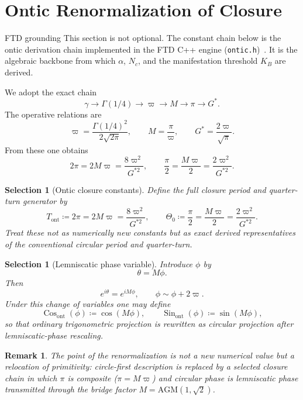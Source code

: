 \documentclass[11pt]{article}
\theoremstyle{tight}
\theoremstyle{plainroman}
\newtheorem{selection}[theorem]{Selection}
\newtheorem{remark}[theorem]{Remark}
\newcommand{\Tont}{T_{\mathrm{ont}}}
\newcommand{\Thetaont}{\Theta_{0}}
\newcommand{\Cosont}{\operatorname{Cos}_{\mathrm{ont}}}
\newcommand{\Sinont}{\operatorname{Sin}_{\mathrm{ont}}}
\begin{document}
\section{Ontic Renormalization of Closure}

\begin{cautionbox}{FTD grounding}
This section is not optional. The constant chain below is the ontic derivation chain implemented in the FTD C++ engine (\texttt{ontic.h})~\cite{ftdengine}.
It is the algebraic backbone from which $\alpha$, $N_c$, and the manifestation threshold $K_B$ are derived.
\end{cautionbox}

We adopt the exact chain
\[
\gamma \longrightarrow \Gamma(1/4) \longrightarrow \varpi \longrightarrow M \longrightarrow \pi \longrightarrow G^*.
\]
The operative relations are
\[
\varpi=\frac{\Gamma(1/4)^2}{2\sqrt{2\pi}},
\qquad
M=\frac{\pi}{\varpi},
\qquad
G^*=\frac{2\varpi}{\sqrt{\pi}}.
\]
From these one obtains
\[
2\pi=2M\varpi=\frac{8\varpi^2}{G^{*2}},
\qquad
\frac{\pi}{2}=\frac{M\varpi}{2}=\frac{2\varpi^2}{G^{*2}}.
\]
\begin{selection}[Ontic closure constants]
Define the full closure period and quarter-turn generator by
\[
\Tont \coloneqq 2\pi=2M\varpi=\frac{8\varpi^2}{G^{*2}},
\qquad
\Thetaont \coloneqq \frac{\pi}{2}=\frac{M\varpi}{2}=\frac{2\varpi^2}{G^{*2}}.
\]
Treat these not as numerically new constants but as exact derived representatives of the conventional circular period and quarter-turn.
\end{selection}
\begin{selection}[Lemniscatic phase variable]
Introduce $\phi$ by
\[
\theta=M\phi.
\]
Then
\[
e^{i\theta}=e^{iM\phi},
\qquad
\phi\sim \phi+2\varpi.
\]
Under this change of variables one may define
\[
\Cosont(\phi)\coloneqq \cos(M\phi),
\qquad
\Sinont(\phi)\coloneqq \sin(M\phi),
\]
so that ordinary trigonometric projection is rewritten as circular projection after lemniscatic-phase rescaling.
\end{selection}
\begin{remark}
The point of the renormalization is not a new numerical value but a relocation of primitivity: circle-first description is replaced by a selected closure chain in which $\pi$ is composite ($\pi=M\varpi$) and circular phase is lemniscatic phase transmitted through the bridge factor $M=\mathrm{AGM}(1,\sqrt{2})$.
\end{remark}
\end{document}
